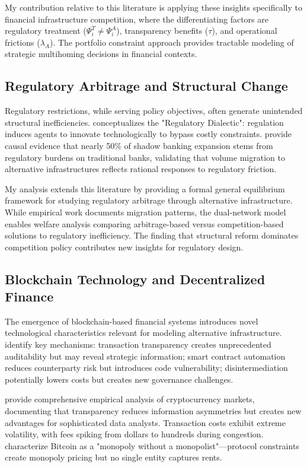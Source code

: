 \documentclass[12pt]{article}
\begin{document}
My contribution relative to this literature is applying these insights specifically to financial infrastructure competition, where the differentiating factors are regulatory treatment ($\Psi_i^T \neq \Psi_i^A$), transparency benefits ($\tau$), and operational frictions ($\lambda_A$). The portfolio constraint approach provides tractable modeling of strategic multihoming decisions in financial contexts.

\subsection{Regulatory Arbitrage and Structural Change}

Regulatory restrictions, while serving policy objectives, often generate unintended structural inefficiencies. \citet{kane_good_1977} conceptualizes the "Regulatory Dialectic": regulation induces agents to innovate technologically to bypass costly constraints. \citet{buchak_fintech_2018} provide causal evidence that nearly 50\% of shadow banking expansion stems from regulatory burdens on traditional banks, validating that volume migration to alternative infrastructures reflects rational responses to regulatory friction.

My analysis extends this literature by providing a formal general equilibrium framework for studying regulatory arbitrage through alternative infrastructure. While empirical work documents migration patterns, the dual-network model enables welfare analysis comparing arbitrage-based versus competition-based solutions to regulatory inefficiency. The finding that structural reform dominates competition policy contributes new insights for regulatory design.

\subsection{Blockchain Technology and Decentralized Finance}

The emergence of blockchain-based financial systems introduces novel technological characteristics relevant for modeling alternative infrastructure. \citet{cong_blockchain_2019} identify key mechanisms: transaction transparency creates unprecedented auditability but may reveal strategic information; smart contract automation reduces counterparty risk but introduces code vulnerability; disintermediation potentially lowers costs but creates new governance challenges.

\citet{makarov_blockchain_2021} provide comprehensive empirical analysis of cryptocurrency markets, documenting that transparency reduces information asymmetries but creates new advantages for sophisticated data analysts. Transaction costs exhibit extreme volatility, with fees spiking from dollars to hundreds during congestion. \citet{huberman_monopoly_2021} characterize Bitcoin as a "monopoly without a monopolist"—protocol constraints create monopoly pricing but no single entity captures rents.
\end{document}
